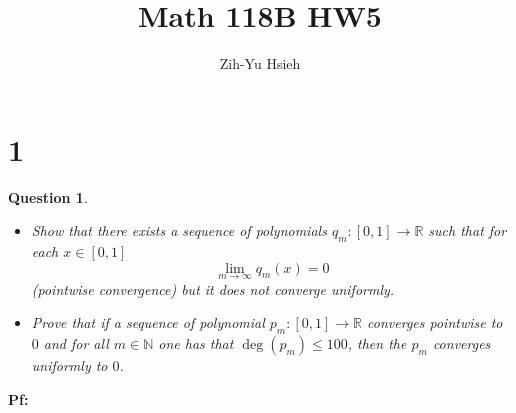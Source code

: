 \documentclass{article}
\title{Math 118B HW5}
\author{Zih-Yu Hsieh}
\newtheorem{question}{Question}
\begin{document}
\maketitle

\section*{1}
\begin{myBox}[]{}
    \begin{question}
        
        \hfill
        
        \begin{itemize}
            \item[(a)] Show that there exists a sequence of polynomials $q_m:[0,1]\rightarrow\mathbb{R}$ such that for each $x\in [0,1]$
            $$\lim_{m\rightarrow\infty}q_m(x)=0$$
            (pointwise convergence) but it does not converge uniformly.

            \item[(b)] Prove that if a sequence of polynomial $p_m:[0,1]\rightarrow\mathbb{R}$ converges pointwise to $0$ and for all $m\in\mathbb{N}$ one has that
            $\deg(p_m)\leq 100$, then the $p_m$ converges uniformly to $0$.
        \end{itemize}
    \end{question}
\end{myBox}

\textbf{Pf:}
\end{document}
